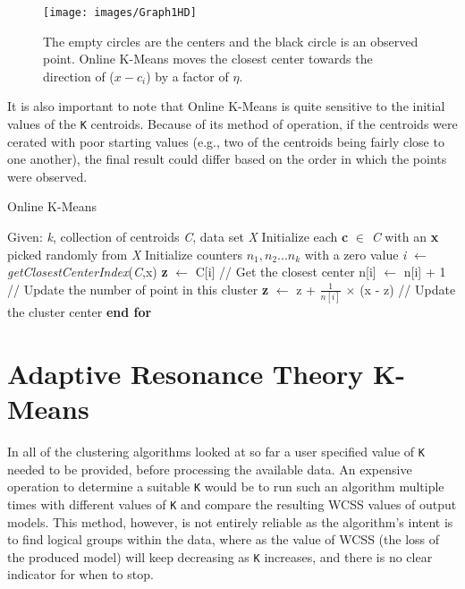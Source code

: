 \documentclass{l4proj}
\begin{document}
\begin{figure}[H]
	\centering
    \texttt{[image: images/Graph1HD]}
    \caption{The empty circles are the centers and the black circle is an observed point. Online K-Means moves the closest center towards the direction of ($x-c_i$) by a factor of $\eta$.} 
    \label{onlineGraph}
\end{figure}

It is also important to note that Online K-Means is quite sensitive to the initial values of the \texttt{K} centroids. Because of its method of operation, if the centroids were cerated with poor starting values (e.g., two of the centroids being fairly close to one another), the final result could differ based on the order in which the points were observed.

\begin{algorithm}
\caption{Online K-Means}\label{online-alg}
\begin{algorithmic}[1]
\State Given: \textit{k}, collection of centroids \textit{C}, data set \textit{X}
\State Initialize each \textbf{c} $\in$ \textit{C} with an \textbf{x} picked randomly from \textit{X}
\State Initialize counters $n_{1}, n_{2} ... n_{k}$ with a zero value
    \State \textit{i}  $\gets$ \textit{getClosestCenterIndex}(\textit{C},x)
    \State \textbf{z}  $\gets$ C[i] \hspace{2.25cm} // Get the closest center
    \State n[i] $\gets$ n[i] + 1 \hspace{1.3cm} // Update the number of point in this cluster
    \State \textbf{z} $\gets$ z + $\frac{1}{n[i]}$ $\times$ (x - z) \hspace{0.35cm} // Update the cluster center
\EndFor
\State \textbf{end for}
\end{algorithmic}
\end{algorithm}

\section{Adaptive Resonance Theory K-Means}

In all of the clustering algorithms looked at so far a user specified value of \texttt{K} needed to be provided, before processing the available data. An expensive operation to determine a suitable \texttt{K} would be to run such an algorithm multiple times with different values of \texttt{K} and compare the resulting WCSS values of output models. This method, however, is not entirely reliable as the algorithm's intent is to find logical groups within the data, where as the value of WCSS (the loss of the produced model) will keep decreasing as \texttt{K} increases, and there is no clear indicator for when to stop\cite{LearnK}.
\end{document}

